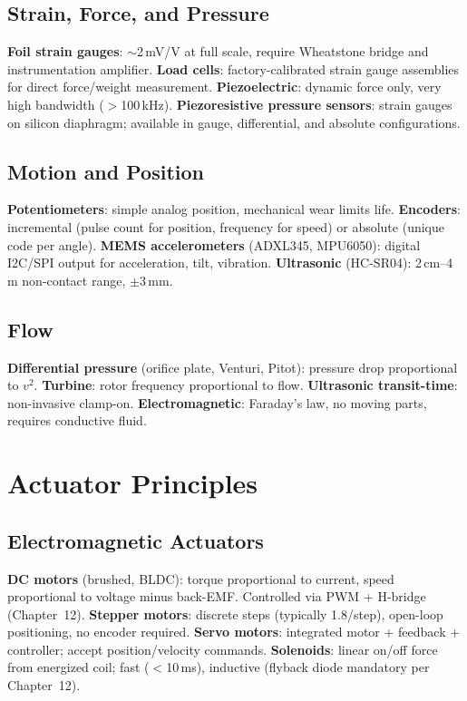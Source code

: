 \subsection{Strain, Force, and Pressure}
\textbf{Foil strain gauges}: $\sim$2\,mV/V at full scale, require Wheatstone bridge and instrumentation amplifier. \textbf{Load cells}: factory-calibrated strain gauge assemblies for direct force/weight measurement. \textbf{Piezoelectric}: dynamic force only, very high bandwidth ($>$100\,kHz). \textbf{Piezoresistive pressure sensors}: strain gauges on silicon diaphragm; available in gauge, differential, and absolute configurations.

\subsection{Motion and Position}
\textbf{Potentiometers}: simple analog position, mechanical wear limits life. \textbf{Encoders}: incremental (pulse count for position, frequency for speed) or absolute (unique code per angle). \textbf{MEMS accelerometers} (ADXL345, MPU6050): digital I2C/SPI output for acceleration, tilt, vibration. \textbf{Ultrasonic} (HC-SR04): 2\,cm--4\,m non-contact range, $\pm$3\,mm.

\subsection{Flow}
\textbf{Differential pressure} (orifice plate, Venturi, Pitot): pressure drop proportional to $v^2$. \textbf{Turbine}: rotor frequency proportional to flow. \textbf{Ultrasonic transit-time}: non-invasive clamp-on. \textbf{Electromagnetic}: Faraday's law, no moving parts, requires conductive fluid.

\section{Actuator Principles}

\subsection{Electromagnetic Actuators}
\textbf{DC motors} (brushed, BLDC): torque proportional to current, speed proportional to voltage minus back-EMF. Controlled via PWM + H-bridge (Chapter~12). \textbf{Stepper motors}: discrete steps (typically 1.8\degC{}/step), open-loop positioning, no encoder required. \textbf{Servo motors}: integrated motor + feedback + controller; accept position/velocity commands. \textbf{Solenoids}: linear on/off force from energized coil; fast ($<$10\,ms), inductive (flyback diode mandatory per Chapter~12).

